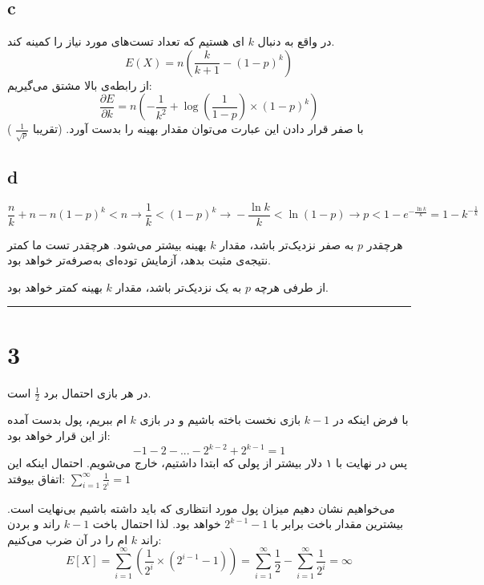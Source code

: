 \documentclass{article}
\begin{document}
\subsection*{c}
در واقع به دنبال
$k$
ای هستیم که تعداد تست‌های مورد نیاز را کمینه کند.
$$ E(X) = n \left( \frac{k}{k+1} - (1 - p)^k \right) $$
از رابطه‌ی بالا مشتق می‌گیریم:
$$\frac{\partial E}{\partial k} = n \left(- \frac{1}{k^2} + \log(\frac{1}{1-p}) \times (1-p)^k \right)$$
با صفر قرار دادن این عبارت می‌توان مقدار بهینه را بدست آورد. (تقریبا
$\frac{1}{\sqrt{p}}$
)

\subsection*{d}
$$\frac{n}{k} + n - n(1-p)^k < n \xrightarrow{} \frac{1}{k} < (1-p)^k \xrightarrow{} - \frac{\ln k}{k} < \ln(1-p) \xrightarrow{} p < 1 - e^{- \frac{\ln k}{k}} = 1 - k^{- \frac{1}{k}}$$

هرچقدر
$p$
به صفر نزدیک‌تر باشد، مقدار
$k$
بهینه بیشتر می‌شود. هرچقدر تست ما کمتر نتیجه‌ی مثبت بدهد، آزمایش توده‌ای به‌صرفه‌تر خواهد بود.

از طرفی هرچه
$p$
به یک نزدیک‌تر باشد، مقدار
$k$
بهینه کمتر خواهد بود.

\rule{\linewidth}{1pt}
\section*{3}

در هر بازی احتمال برد
$\frac{1}{2}$
است.

با فرض اینکه در
$k-1$
بازی نخست باخته باشیم و در بازی
$k$
ام ببریم، پول بدست آمده از این قرار خواهد بود:
$$-1-2-...-2^{k-2}+2^{k-1} = 1$$
پس در نهایت با ۱ دلار بیشتر از پولی که ابتدا داشتیم، خارج می‌شویم. احتمال اینکه این اتفاق بیوفتد:
$\sum^{\infty}_{i=1}\frac{1}{2^i} = 1$

می‌خواهیم نشان دهیم میزان پول مورد انتظاری که باید داشته باشیم بی‌نهایت است. بیشترین مقدار باخت برابر با
$2^{k-1} - 1$
خواهد بود. لذا احتمال باخت
$k-1$
راند و بردن راند
$k$
ام را در آن ضرب می‌کنیم:
$$E[X] = \sum^{\infty}_{i=1} \left(\frac{1}{2^i} \times \left(2^{i-1}-1\right) \right) = \sum^{\infty}_{i=1} \frac{1}{2} - \sum^{\infty}_{i=1} \frac{1}{2^i} = \infty$$
\end{document}
